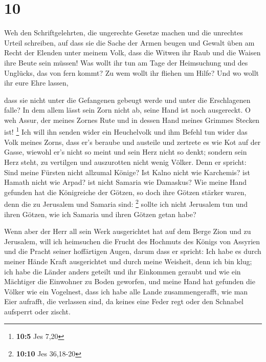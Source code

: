 \hypertarget{section-5}{%
\section{10}\label{section-5}}

 Weh den Schriftgelehrten, die ungerechte Gesetze machen und
die unrechtes Urteil schreiben,  auf dass sie die Sache der
Armen beugen und Gewalt üben am Recht der Elenden unter meinem Volk,
dass die Witwen ihr Raub und die Waisen ihre Beute sein müssen!
 Was wollt ihr tun am Tage der Heimsuchung und des Unglücks,
das von fern kommt? Zu wem wollt ihr fliehen um Hilfe? Und wo wollt ihr
eure Ehre lassen,

 dass sie nicht unter die Gefangenen gebeugt werde und unter
die Erschlagenen falle? In dem allem lässt sein Zorn nicht ab, seine
Hand ist noch ausgereckt.  O weh Assur, der meines Zornes
Rute und in dessen Hand meines Grimmes Stecken ist! \footnote{\textbf{10:5}
  Jes 7,20}  Ich will ihn senden wider ein Heuchelvolk und
ihm Befehl tun wider das Volk meines Zorns, dass er's beraube und
austeile und zertrete es wie Kot auf der Gasse,  wiewohl
er's nicht so meint und sein Herz nicht so denkt; sondern sein Herz
steht, zu vertilgen und auszurotten nicht wenig Völker. 
Denn er spricht: Sind meine Fürsten nicht allzumal Könige? 
Ist Kalno nicht wie Karchemis? ist Hamath nicht wie Arpad? ist nicht
Samaria wie Damaskus?  Wie meine Hand gefunden hat die
Königreiche der Götzen, so doch ihre Götzen stärker waren, denn die zu
Jerusalem und Samaria sind: \footnote{\textbf{10:10} Jes 36,18-20}
 sollte ich nicht Jerusalem tun und ihren Götzen, wie ich
Samaria und ihren Götzen getan habe?

 Wenn aber der Herr all sein Werk ausgerichtet hat auf dem
Berge Zion und zu Jerusalem, will ich heimsuchen die Frucht des Hochmuts
des Königs von Assyrien und die Pracht seiner hoffärtigen Augen,
 darum dass er spricht: Ich habe es durch meiner Hände
Kraft ausgerichtet und durch meine Weisheit, denn ich bin klug; ich habe
die Länder anders geteilt und ihr Einkommen geraubt und wie ein
Mächtiger die Einwohner zu Boden geworfen,  und meine Hand
hat gefunden die Völker wie ein Vogelnest, dass ich habe alle Lande
zusammengerafft, wie man Eier aufrafft, die verlassen sind, da keines
eine Feder regt oder den Schnabel aufsperrt oder zischt.

